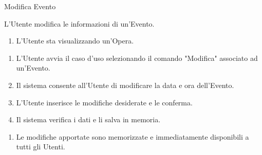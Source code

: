 {\ucExtTable	%
{	%
	Modifica Evento
	
}{	%
	
}{	%
	L'Utente modifica le informazioni di un'Evento.
	
}{	%
	\attori
	
}{	%
	\begin{enumerate}
        \item L'Utente sta visualizzando un'Opera.
    \end{enumerate}
	
}{	%
	\begin{enumerate}
        \item L'Utente avvia il caso d'uso selezionando il comando "Modifica" associato ad un'Evento.
        \item Il sistema consente all'Utente di modificare la data e ora dell'Evento.
        \item L'Utente inserisce le modifiche desiderate e le conferma.
        \item Il sistema verifica i dati e li salva in memoria.
    \end{enumerate}
	
}{	%
	\begin{enumerate}
        \item Le modifiche apportate sono memorizzate e immediatamente disponibili a tutti gli Utenti.
    \end{enumerate}
	
} }

